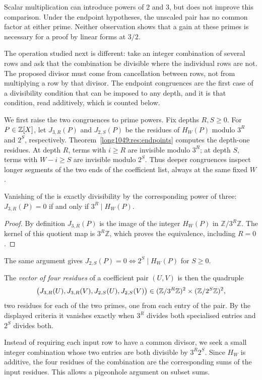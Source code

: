 \documentclass[11pt]{article}
\begin{document}
\noindent Scalar multiplication can introduce powers of $2$ and $3$,
but does not improve this comparison. Under the endpoint hypotheses,
the unscaled pair has no common factor at either prime. Neither
observation shows that a gain at these primes is necessary for a proof
by linear forms at $3/2$.

The operation studied next is different: take an integer combination
of several rows and ask that the combination be divisible where the
individual rows are not. The proposed divisor must come from
cancellation between rows, not from multiplying a row by that divisor.
The endpoint congruences are the first case of a divisibility condition that can be imposed
to any depth, and it is that condition, read additively, which is counted
below.

We first raise the two congruences to prime powers.  Fix depths \(R,S\ge0\).
For $P\in\mathbb{Z}[X]$, let $J_{3,R}(P)$ and $J_{2,S}(P)$ be the residues of
$H_W(P)$ modulo $3^R$ and $2^S$, respectively.
Theorem~\ref{long1049:res:endpoints} computes the depth-one residues.
At depth $R$, terms with $i\ge R$ are invisible modulo $3^R$;
at depth $S$, terms with $W-i\ge S$ are invisible modulo $2^S$.
Thus deeper congruences inspect longer segments of the two ends
of the coefficient list, always at the same fixed $W$.

\begin{lemma}\label{res:bottomjet}
Vanishing of the
is exactly divisibility by the corresponding power of three:
$J_{3,R}(P)=0$ if and only if $3^R\mid H_W(P)$.
\end{lemma}
\begin{proof}
By definition $J_{3,R}(P)$ is the image of the integer $H_W(P)$ in
$\mathbb Z/3^R\mathbb Z$. The kernel of this quotient map is
$3^R\mathbb Z$, which proves the equivalence, including $R=0$.
\end{proof}
The same argument gives
$J_{2,S}(P)=0\iff2^S\mid H_W(P)$ for $S\ge0$.

The \emph{vector of four residues} of a coefficient pair
\((U,V)\) is then the quadruple
\[
 \bigl(J_{3,R}(U),J_{3,R}(V),J_{2,S}(U),J_{2,S}(V)\bigr)
 \in(\mathbb{Z}/3^R\mathbb{Z})^2\times(\mathbb{Z}/2^S\mathbb{Z})^2 ,
\]
two residues for each of the two primes, one from each entry of the pair.  By
the displayed criteria it vanishes exactly when \(3^R\) divides both specialised
entries and \(2^S\) divides both.

Instead of requiring each input row to have a common divisor, we seek
a small integer combination whose two entries are both divisible by
$3^R2^S$. Since $H_W$ is additive, the four residues of the combination
are the corresponding sums of the input residues. This allows a
pigeonhole argument on subset sums.
\end{document}
